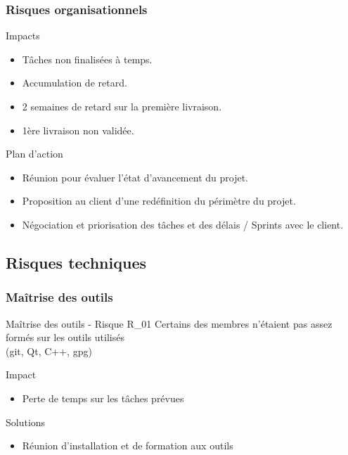     \begin{frame}
      \frametitle{\color{white}Risques organisationnels}
      \begin{alertblock}{Impacts}
      	\begin{itemize}
      	 \item Tâches non finalisées à temps.
      	 \item Accumulation de retard.
      	 \item 2 semaines de retard sur la première livraison.
      	 \item 1ère livraison non validée.
      	\end{itemize}
      \end{alertblock}
      \pause
      \begin{exampleblock}{Plan d'action}
        \begin{itemize}
          \item Réunion pour évaluer l'état d'avancement du projet.
          \item Proposition au client d'une redéfinition du périmètre du projet.
          \item Négociation et priorisation des tâches et des délais / Sprints avec le client.
        \end{itemize}
      \end{exampleblock}
    \end{frame}

  \subsection{Risques techniques}
    \begin{frame}
      \frametitle{\color{white}Maîtrise des outils}
      \begin{block}{Maîtrise des outils - Risque R\_01}
        Certains des membres n'étaient pas assez formés sur les outils utilisés\\
        (git, Qt, C++, gpg)
      \end{block}
      \pause
      \begin{alertblock}{Impact}
        \begin{itemize}
          \item Perte de temps sur les tâches prévues
        \end{itemize}
      \end{alertblock}
      \pause
      \begin{exampleblock}{Solutions}
        \begin{itemize}
          \item Réunion d'installation et de formation aux outils 
        \end{itemize}
      \end{exampleblock}
    \end{frame}

